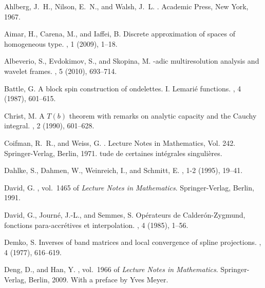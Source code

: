 \documentclass{amsart}
\numberwithin{equation}{section}
\theoremstyle{plain}
\theoremstyle{definition}
\theoremstyle{remark}
\begin{document}
{{{

\begin{thebibliography}{10}

{\sc Ahlberg, J.~H., Nilson, E.~N., and Walsh, J.~L.}
.
\newblock Academic Press, New York, 1967.

{\sc Aimar, H., Carena, M., and Iaffei, B.}
\newblock Discrete approximation of spaces of homogeneous type.
, 1 (2009), 1--18.

{\sc Albeverio, S., Evdokimov, S., and Skopina, M.}
-adic multiresolution analysis and wavelet frames.
, 5 (2010), 693--714.

{\sc Battle, G.}
\newblock A block spin construction of ondelettes. {I}. {L}emari\'e functions.
, 4 (1987), 601--615.

{\sc Christ, M.}
\newblock A {$T(b)$} theorem with remarks on analytic capacity and the {C}auchy
  integral.
, 2 (1990), 601--628.

{\sc Coifman, R.~R., and Weiss, G.}
.
\newblock Lecture Notes in Mathematics, Vol. 242. Springer-Verlag, Berlin,
  1971.
tude de certaines int{\'e}grales singuli{\`e}res.

{\sc Dahlke, S., Dahmen, W., Weinreich, I., and Schmitt, E.}
, 1-2 (1995), 19--41.

{\sc David, G.}
,
  vol.~1465 of {\em Lecture Notes in Mathematics}.
\newblock Springer-Verlag, Berlin, 1991.

{\sc David, G., Journ{\'e}, J.-L., and Semmes, S.}
\newblock Op\'erateurs de {C}alder\'on-{Z}ygmund, fonctions para-accr\'etives
  et interpolation.
, 4 (1985), 1--56.

{\sc Demko, S.}
\newblock Inverses of band matrices and local convergence of spline
  projections.
, 4 (1977), 616--619.

{\sc Deng, D., and Han, Y.}
, vol.~1966 of
  {\em Lecture Notes in Mathematics}.
\newblock Springer-Verlag, Berlin, 2009.
\newblock With a preface by Yves Meyer.


\end{thebibliography}}}}
\end{document}
